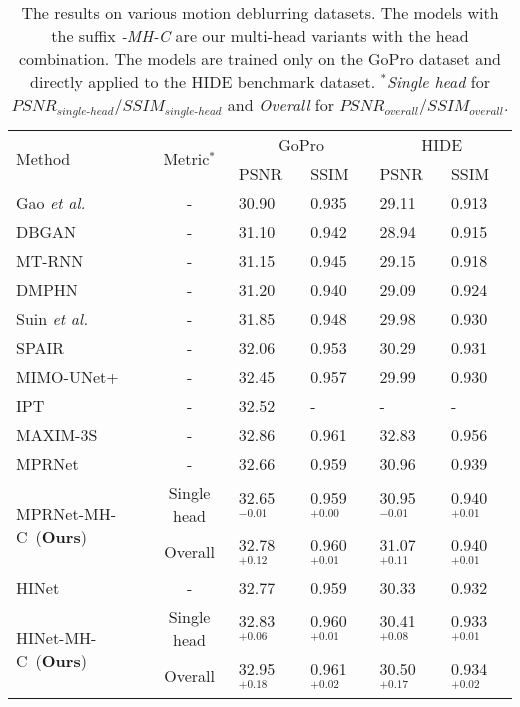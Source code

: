 \documentclass[letterpaper]{article} \usepackage{aaai23}  \usepackage{times}  \usepackage{helvet}  \usepackage{courier}  \usepackage[hyphens]{url}  \usepackage{graphicx} \urlstyle{rm} \def\UrlFont{\rm}  \usepackage{natbib}  \usepackage{caption} \frenchspacing  \setlength{\pdfpagewidth}{8.5in} \setlength{\pdfpageheight}{11in} \usepackage{algorithm}
\begin{document}
\newcommand\unknowna{\multicolumn{2}{c|}{-}}
\newcommand\unknownb{\multicolumn{2}{c}{-}}
\begin{table*}[t]
\centering
\caption{The results on various motion deblurring datasets. The models with the suffix \textit{-MH-C} are our multi-head variants with the head combination. The models are trained only on the GoPro dataset and directly applied to the HIDE benchmark dataset. $^*$\textit{Single head} for $P\!S\!N\!R_{single\mbox{-}head}/S\!S\!I\!M_{single\mbox{-}head}$ and \textit{Overall} for $P\!S\!N\!R_{overall}/S\!S\!I\!M_{overall}$.}
\label{tab:result}
\begin{tabular}{l|c|ll|ll}\toprule
\multirow{2}{*}{Method}& \multirow{2}{*}{Metric$^*$} & \multicolumn{2}{c|}{GoPro} & \multicolumn{2}{c}{HIDE} \\ && PSNR & SSIM & PSNR & SSIM \\ \midrule Gao \textit{et al.}~\cite{gao2019dynamic}      &           - & 30.90 & 0.935 & 29.11 & 0.913 \\ DBGAN~\cite{zhang2020deblurring}               &           - & 31.10 & 0.942 & 28.94 & 0.915 \\ MT-RNN~\cite{park2020multi}                    &           - & 31.15 & 0.945 & 29.15 & 0.918 \\ DMPHN~\cite{zhang2019deep}                     &           - & 31.20 & 0.940 & 29.09 & 0.924 \\ Suin \textit{et al.}~\cite{suin2020spatially}  &           - & 31.85 & 0.948 & 29.98 & 0.930 \\ SPAIR~\cite{purohit2021spatially}              &           - & 32.06 & 0.953 & 30.29 & 0.931 \\ MIMO-UNet+~\cite{cho2021rethinking}            &           - & 32.45 & 0.957 & 29.99 & 0.930 \\ IPT~\cite{chen2021pre}                         &           - & 32.52 &\quad- &\quad- &\quad- \\ MAXIM-3S~\cite{tu2022maxim}                    &           - & 32.86 & 0.961 & 32.83 & 0.956 \\ \midrule
MPRNet~\cite{zamir2021multi}                   &           - & 32.66 & 0.959 & 30.96 & 0.939 \\ \multirow{2}{*}{MPRNet-MH-C~(\textbf{Ours})}   & Single head & 32.65$^{-0.01}$ & 0.959$^{+0.00}$ & 30.95$^{-0.01}$ & 0.940$^{+0.01}$ \\ &     Overall & 32.78$^{+0.12}$ & 0.960$^{+0.01}$ & 31.07$^{+0.11}$ & 0.940$^{+0.01}$ \\ \midrule
HINet~\cite{chen2021hinet}                     &           - & 32.77 & 0.959 & 30.33 & 0.932 \\ \multirow{2}{*}{HINet-MH-C~(\textbf{Ours})}    & Single head & 32.83$^{+0.06}$ & 0.960$^{+0.01}$ & 30.41$^{+0.08}$ & 0.933$^{+0.01}$ \\ &     Overall & 32.95$^{+0.18}$ & 0.961$^{+0.02}$ & 30.50$^{+0.17}$ & 0.934$^{+0.02}$ \\ \midrule

\end{tabular}
\end{table*}
\end{document}

